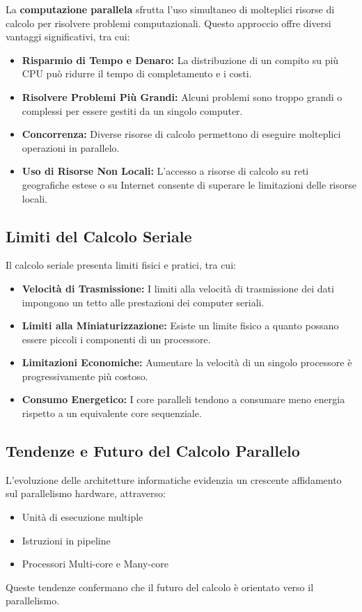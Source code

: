 La \textbf{computazione parallela} sfrutta l'uso simultaneo di molteplici
risorse di calcolo per risolvere problemi computazionali. Questo approccio
offre diversi vantaggi significativi, tra cui:
\begin{itemize}
    \item \textbf{Risparmio di Tempo e Denaro:} La distribuzione di un compito su più CPU può ridurre il tempo di completamento e i costi.
    \item \textbf{Risolvere Problemi Più Grandi:} Alcuni problemi sono troppo grandi o complessi per essere gestiti da un singolo computer.
    \item \textbf{Concorrenza:} Diverse risorse di calcolo permettono di eseguire molteplici operazioni in parallelo.
    \item \textbf{Uso di Risorse Non Locali:} L'accesso a risorse di calcolo su reti geografiche estese o su Internet consente di superare le limitazioni delle risorse locali.
\end{itemize}

\subsection{Limiti del Calcolo Seriale}
Il calcolo seriale presenta limiti fisici e pratici, tra cui:
\begin{itemize}
    \item \textbf{Velocità di Trasmissione:} I limiti alla velocità di trasmissione dei dati impongono un tetto alle prestazioni dei computer seriali.
    \item \textbf{Limiti alla Miniaturizzazione:} Esiste un limite fisico a quanto possano essere piccoli i componenti di un processore.
    \item \textbf{Limitazioni Economiche:} Aumentare la velocità di un singolo processore è progressivamente più costoso.
    \item \textbf{Consumo Energetico:} I core paralleli tendono a consumare meno energia rispetto a un equivalente core sequenziale.
\end{itemize}

\subsection{Tendenze e Futuro del Calcolo Parallelo}
L'evoluzione delle architetture informatiche evidenzia un crescente affidamento sul parallelismo hardware, attraverso:
\begin{itemize}
    \item Unità di esecuzione multiple
    \item Istruzioni in pipeline
    \item Processori Multi-core e Many-core
\end{itemize}
Queste tendenze confermano che il futuro del calcolo è orientato verso
il parallelismo.
